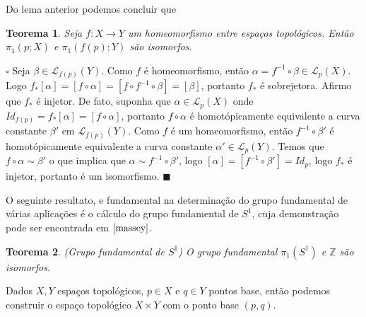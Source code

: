 \documentclass[12pt]{book}
\newtheorem{teorema}{Teorema}[section]
\newenvironment{prova}[1]{$\square$ #1}{\hfill$\blacksquare$}
\newcommand{\caminhos}{\mathcal{L}}
\newcommand{\caminhospontobasegeral}[2]{\caminhos_{#1}(#2)}
\newcommand{\circulo}{S^{1}}
\newcommand{\classe}[1]{[#1]}
\newcommand{\grupofundamental}[1]{\pi_{1}(#1)}
\newcommand{\grupofundamentalpontobase}[2]{\pi_{1}(#1; #2)}
\newcommand{\inteiros}{\mathbb{Z}}
\begin{document}
	Do lema anterior podemos concluir que
	\begin{teorema}
		Seja $f:X\to Y$ um homeomorfismo entre espaços topológicos. Então $\grupofundamentalpontobase{p}{X}$ e $\grupofundamentalpontobase{f(p)}{Y}$ são isomorfos.
	\end{teorema}
	\begin{prova}
		Seja $\beta \in \caminhospontobasegeral{f(p)}{Y}$. Como $f$ é homeomorfismo, então $\alpha=f^{-1}\circ\beta \in \caminhospontobasegeral{p}{X}$. Logo $f_{*}\classe{\alpha} = \classe{f\circ\alpha} = \classe{f\circ f^{-1}\circ\beta}=\classe{\beta}$, portanto $f_{*}$ é sobrejetora. Afirmo que $f_{*}$ é injetor. De fato, suponha que $\alpha \in \caminhospontobasegeral{p}{X}$ onde $Id_{f(p)}=f_{*}\classe{\alpha} = \classe{f\circ \alpha} $, portanto $f\circ\alpha$ é homotópicamente equivalente a curva constante $\beta'$ em $\caminhospontobasegeral{f(p)}{Y}$. Como $f$ é um homeomorfismo, então $f^{-1}\circ\beta'$ é homotópicamente equivalente a curva constante $\alpha' \in \caminhospontobasegeral{p}{Y}$. Temos que $f\circ \alpha\sim \beta'$ o que implica que $\alpha \sim f^{-1}\circ \beta'$, logo $\classe{\alpha} = \classe{f^{-1}\circ \beta'} = Id_{p}$, logo $f_{*}$ é injetor, portanto é um isomorfismo.
	\end{prova}
	
	O seguinte resultato, e fundamental na determinação do grupo fundamental de várias aplicações é o cálculo do grupo fundamental de $\circulo$, cuja demonstração pode ser encontrada em $\cite{massey}$.
	
	\begin{teorema}\label{teorema_grupo_fundamental_circulo}
		(Grupo fundamental de $\circulo$) O grupo fundamental $\grupofundamental{\circulo}$ e $\inteiros$ são isomorfos.
	\end{teorema} 
	
	Dados $X, Y$ espaços topológicos, $p\in X$ e $q\in Y$ pontos base, então podemos construir o espaço topológico $X\times Y$ com o ponto base $(p,q)$.
	
\end{document}
